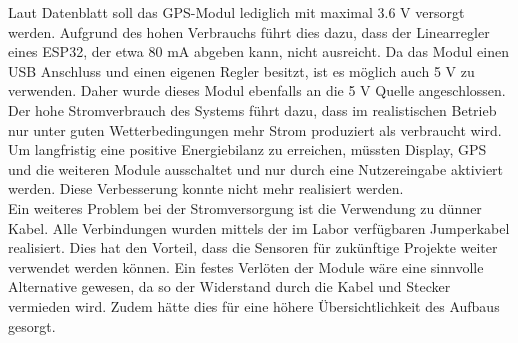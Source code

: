 \documentclass[12pt,a4paper,bibliography=totocnumbered,listof=totocnumbered]{article}
\begin{document}
Laut Datenblatt soll das GPS-Modul lediglich mit maximal 3.6 V versorgt werden.
Aufgrund des hohen Verbrauchs führt dies dazu, dass der Linearregler eines ESP32, der etwa 80 mA abgeben kann, nicht ausreicht.
Da das Modul einen USB Anschluss und einen eigenen Regler besitzt, ist es möglich auch 5 V zu verwenden.
Daher wurde dieses Modul ebenfalls an die 5 V Quelle angeschlossen.\\
Der hohe Stromverbrauch des Systems führt dazu, dass im realistischen Betrieb nur unter guten Wetterbedingungen mehr Strom produziert als verbraucht wird.
Um langfristig eine positive Energiebilanz zu erreichen, müssten Display, GPS und die weiteren Module ausschaltet und nur durch eine Nutzereingabe aktiviert werden.
Diese Verbesserung konnte nicht mehr realisiert werden.\\
Ein weiteres Problem bei der Stromversorgung ist die Verwendung zu dünner Kabel.
Alle Verbindungen wurden mittels der im Labor verfügbaren Jumperkabel realisiert.
Dies hat den Vorteil, dass die Sensoren für zukünftige Projekte weiter verwendet werden können.
Ein festes Verlöten der Module wäre eine sinnvolle Alternative gewesen, da so der Widerstand durch die Kabel und Stecker vermieden wird.
Zudem hätte dies für eine höhere Übersichtlichkeit des Aufbaus gesorgt.
\end{document}
